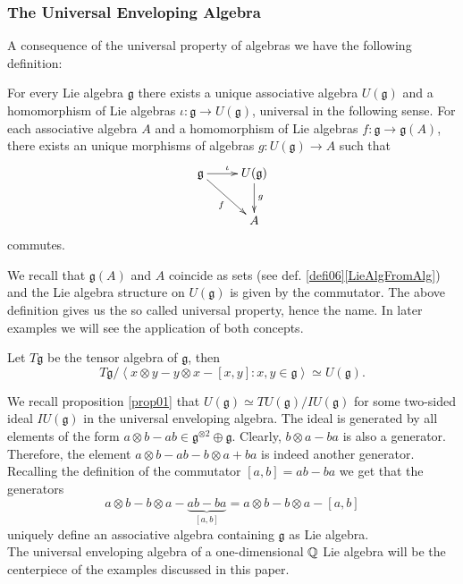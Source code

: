 \subsubsection{The Universal Enveloping Algebra}
A consequence of the universal property of algebras we have the following definition:
\begin{defi}\label{defi07}
For every Lie algebra $\mathfrak{g}$ there exists a unique associative algebra $U(\mathfrak{g})$ and a homomorphism of Lie algebras $\iota : \mathfrak{g} \longrightarrow U(\mathfrak{g})$, universal in the following sense. For each associative algebra $A$ and a homomorphism of Lie algebras $f : \mathfrak{g} \longrightarrow \mathfrak{g}(A)$, there exists an unique morphisms of algebras $g : U(\mathfrak{g}) \longrightarrow A$ such that
$$\xymatrix{
\mathfrak{g} \ar[r]^{\iota}\ar[dr]_f & U(\mathfrak{g})\ar[d]^g\\
&A\\
}$$
commutes.
\end{defi}
We recall that $\mathfrak{g}(A)$ and $A$ coincide as sets (see def. \ref{defi06}\ref{LieAlgFromAlg}) and the Lie algebra structure on $U(\mathfrak{g})$ is given by the commutator. The above definition gives us the so called universal property, hence the name. In later examples we will see the application of both concepts.
\begin{prop}\label{prop05}
Let $T\mathfrak{g}$ be the tensor algebra of $\mathfrak{g}$, then
$$T \mathfrak{g}/\left<x \otimes y - y \otimes x - [x,y]: x, y \in \mathfrak{g}\right> \simeq U(\mathfrak{g}).$$
\end{prop}
\bws We recall proposition \ref{prop01} that $U(\mathfrak{g}) \simeq T U(\mathfrak{g})/I U(\mathfrak{g})$ for some two-sided ideal $IU(\mathfrak{g})$ in the universal enveloping algebra. The ideal is generated by all elements of the form $a \otimes b - a b \in \mathfrak{g}^{\otimes 2} \oplus \mathfrak{g}$. Clearly, $b \otimes a - ba$ is also a generator. Therefore, the element $a \otimes b - a b - b \otimes a + b a$ is indeed another generator. Recalling the definition of the commutator $[a,b] = ab - ba$ we get that
the generators
$$a \otimes b - b \otimes a - \underbrace{a b - b a}_{[a,b]} = a \otimes b - b \otimes a - [a,b]$$
uniquely define an associative algebra containing $\mathfrak{g}$ as Lie algebra.\\
\bmk The universal enveloping algebra of a one-dimensional $\mathbb{Q}$ Lie algebra will be the centerpiece of the examples discussed in this paper.
